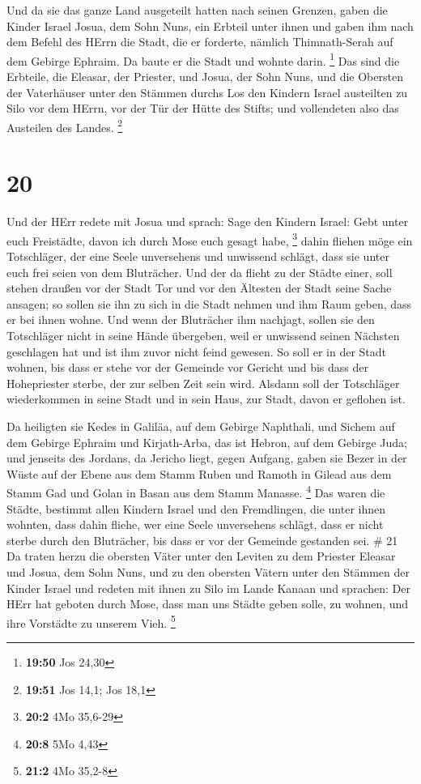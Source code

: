  Und da sie das ganze Land ausgeteilt hatten nach seinen
Grenzen, gaben die Kinder Israel Josua, dem Sohn Nuns, ein Erbteil unter
ihnen  und gaben ihm nach dem Befehl des HErrn die Stadt,
die er forderte, nämlich Thimnath-Serah auf dem Gebirge Ephraim. Da
baute er die Stadt und wohnte darin. \footnote{\textbf{19:50} Jos 24,30}
 Das sind die Erbteile, die Eleasar, der Priester, und
Josua, der Sohn Nuns, und die Obersten der Vaterhäuser unter den Stämmen
durchs Los den Kindern Israel austeilten zu Silo vor dem HErrn, vor der
Tür der Hütte des Stifts; und vollendeten also das Austeilen des Landes.
\footnote{\textbf{19:51} Jos 14,1; Jos 18,1}

\hypertarget{section-10}{%
\section{20}\label{section-10}}

 Und der HErr redete mit Josua und sprach:  Sage
den Kindern Israel: Gebt unter euch Freistädte, davon ich durch Mose
euch gesagt habe, \footnote{\textbf{20:2} 4Mo 35,6-29} 
dahin fliehen möge ein Totschläger, der eine Seele unversehens und
unwissend schlägt, dass sie unter euch frei seien von dem Bluträcher.
 Und der da flieht zu der Städte einer, soll stehen draußen
vor der Stadt Tor und vor den Ältesten der Stadt seine Sache ansagen; so
sollen sie ihn zu sich in die Stadt nehmen und ihm Raum geben, dass er
bei ihnen wohne.  Und wenn der Bluträcher ihm nachjagt,
sollen sie den Totschläger nicht in seine Hände übergeben, weil er
unwissend seinen Nächsten geschlagen hat und ist ihm zuvor nicht feind
gewesen.  So soll er in der Stadt wohnen, bis dass er stehe
vor der Gemeinde vor Gericht und bis dass der Hohepriester sterbe, der
zur selben Zeit sein wird. Alsdann soll der Totschläger wiederkommen in
seine Stadt und in sein Haus, zur Stadt, davon er geflohen ist.

 Da heiligten sie Kedes in Galiläa, auf dem Gebirge
Naphthali, und Sichem auf dem Gebirge Ephraim und Kirjath-Arba, das ist
Hebron, auf dem Gebirge Juda;  und jenseits des Jordans, da
Jericho liegt, gegen Aufgang, gaben sie Bezer in der Wüste auf der Ebene
aus dem Stamm Ruben und Ramoth in Gilead aus dem Stamm Gad und Golan in
Basan aus dem Stamm Manasse. \footnote{\textbf{20:8} 5Mo 4,43}
 Das waren die Städte, bestimmt allen Kindern Israel und den
Fremdlingen, die unter ihnen wohnten, dass dahin fliehe, wer eine Seele
unversehens schlägt, dass er nicht sterbe durch den Bluträcher, bis dass
er vor der Gemeinde gestanden sei. \# 21  Da traten herzu
die obersten Väter unter den Leviten zu dem Priester Eleasar und Josua,
dem Sohn Nuns, und zu den obersten Vätern unter den Stämmen der Kinder
Israel  und redeten mit ihnen zu Silo im Lande Kanaan und
sprachen: Der HErr hat geboten durch Mose, dass man uns Städte geben
solle, zu wohnen, und ihre Vorstädte zu unserem Vieh. \footnote{\textbf{21:2}
  4Mo 35,2-8}

